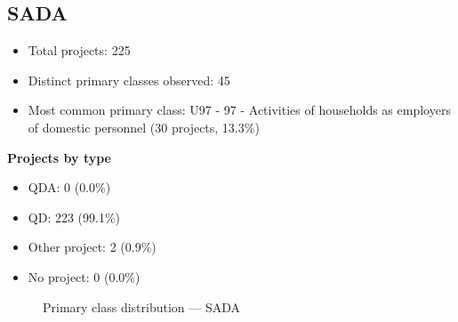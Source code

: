 \subsection{SADA}

\begin{itemize}
    \item Total projects: 225
    \item Distinct primary classes observed: 45
    \item Most common primary class: U97 - 97 - Activities of households as employers of domestic personnel (30 projects, 13.3\%)
\end{itemize}
\textbf{Projects by type}
\begin{itemize}
    \item QDA: 0 (0.0\%)
    \item QD: 223 (99.1\%)
    \item Other project: 2 (0.9\%)
    \item No project: 0 (0.0\%)
\end{itemize}

\begin{figure}[H]
    \centering
    
    \caption{Primary class distribution --- SADA}
\end{figure}

